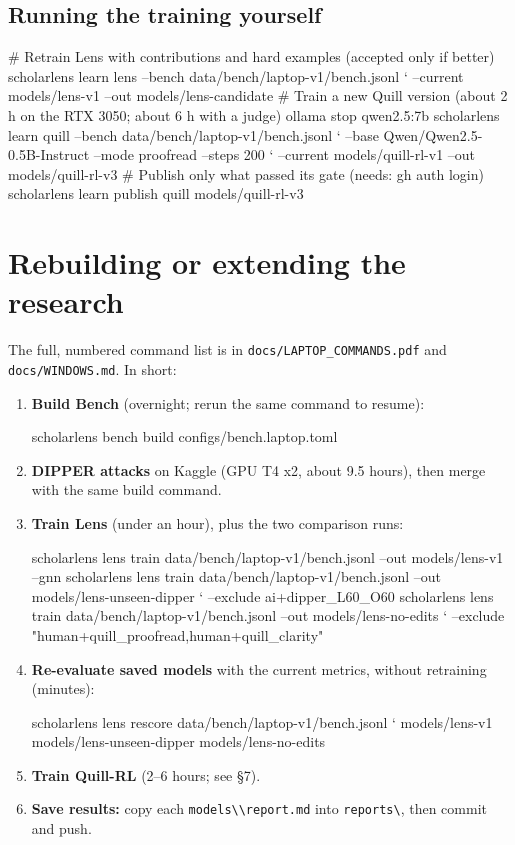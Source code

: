 \documentclass[11pt]{article}
\newcommand{\cm}[1]{\texttt{#1}}
\begin{document}
\subsection*{Running the training yourself}
\begin{cmd}
# Retrain Lens with contributions and hard examples (accepted only if better)
scholarlens learn lens --bench data/bench/laptop-v1/bench.jsonl `
    --current models/lens-v1 --out models/lens-candidate
# Train a new Quill version (about 2 h on the RTX 3050; about 6 h with a judge)
ollama stop qwen2.5:7b
scholarlens learn quill --bench data/bench/laptop-v1/bench.jsonl `
    --base Qwen/Qwen2.5-0.5B-Instruct --mode proofread --steps 200 `
    --current models/quill-rl-v1 --out models/quill-rl-v3
# Publish only what passed its gate (needs: gh auth login)
scholarlens learn publish quill models/quill-rl-v3
\end{cmd}

\section{Rebuilding or extending the research}
\label{sec:research}

The full, numbered command list is in \cm{docs/LAPTOP\_COMMANDS.pdf} and \cm{docs/WINDOWS.md}. In short:

\begin{enumerate}
  \item \textbf{Build Bench} (overnight; rerun the same command to resume):
\begin{cmd}
scholarlens bench build configs/bench.laptop.toml
\end{cmd}
  \item \textbf{DIPPER attacks} on Kaggle (GPU T4 x2, about 9.5 hours), then merge with the same build command.
  \item \textbf{Train Lens} (under an hour), plus the two comparison runs:
\begin{cmd}
scholarlens lens train data/bench/laptop-v1/bench.jsonl --out models/lens-v1 --gnn
scholarlens lens train data/bench/laptop-v1/bench.jsonl --out models/lens-unseen-dipper `
    --exclude ai+dipper_L60_O60
scholarlens lens train data/bench/laptop-v1/bench.jsonl --out models/lens-no-edits `
    --exclude "human+quill_proofread,human+quill_clarity"
\end{cmd}
  \item \textbf{Re-evaluate saved models} with the current metrics, without retraining (minutes):
\begin{cmd}
scholarlens lens rescore data/bench/laptop-v1/bench.jsonl `
    models/lens-v1 models/lens-unseen-dipper models/lens-no-edits
\end{cmd}
  \item \textbf{Train Quill-RL} (2--6 hours; see \S7).
  \item \textbf{Save results:} copy each \cm{models\textbackslash*\textbackslash report.md} into \cm{reports\textbackslash}, then commit and push.
\end{enumerate}
\end{document}
